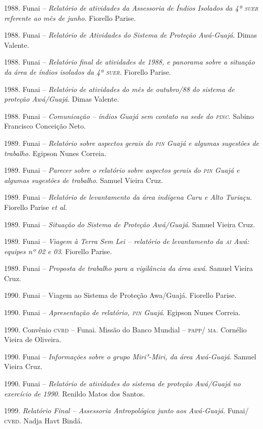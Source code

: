 \begin{bibliohedra}
1988. Funai -- \emph{Relatório de atividades da Assessoria de
Índios Isolados da 4ª \textsc{suer} referente ao mês de junho}. Fiorello Parise.

1988. Funai -- \emph{Relatório de Atividades do Sistema de
Proteção Awá-Guajá}. Dimas Valente.

1988. Funai -- \emph{Relatório final de atividades de 1988, e
panorama sobre a situação da área de índios isolados da 4ª \textsc{suer}}.
Fiorello Parise.

1988. Funai -- \emph{Relatório} \emph{de atividades do mês de
outubro/88 do sistema de proteção Awá/Guajá}. Dimas Valente.

1988. Funai -- \emph{Comunicação -- índios Guajá sem contato na
sede do \textsc{pinc}}. Sabino Francisco Conceição Neto.

1989. Funai -- \emph{Relatório sobre aspectos gerais do \textsc{pin}
Guajá e algumas sugestões de trabalho}. Egipson Nunes Correia.

1989. Funai -- \emph{Parecer sobre o relatório sobre aspectos
gerais do \textsc{pin} Guajá e algumas sugestões de trabalho}. Samuel Vieira
Cruz.

1989. Funai -- \emph{Relatório de levantamento da área indígena
Caru e Alto Turiaçu.} Fiorello Parise \emph{et al}.

1989. Funai -- \emph{Situação do Sistema de Proteção
Awá/Guajá}. Samuel Vieira Cruz.

1989. Funai -- \emph{Viagem à Terra Sem Lei -- relatório de
levantamento da \textsc{ai} Awá: equipes nº 02 e 03}. Fiorello Parise.

1989. Funai -- \emph{Proposta de trabalho para a vigilância da
área awá}. Samuel Vieira Cruz.

1990. Funai -- Viagem ao Sistema de Proteção Awa/Guajá.
Fiorello Parise.

1990. Funai -- \emph{Apresentação de relatório, \textsc{pin} Guajá}.
Egipson Nunes Correia.

1990. Convênio \textsc{cvrd} -- Funai. Missão do Banco Mundial -- \textsc{papp}/
\textsc{ma}. Cornélio Vieira de Oliveira.

1990. Funai -- \emph{Informações sobre o grupo Miri"-Miri, da
área Awá-Guajá}. Samuel Vieira Cruz.

1990. Funai -- \emph{Relatório de atividades do sistema de
proteção Awá/Guajá no exercício de 1990.} Renildo Matos dos Santos.

1999. \emph{Relatório Final -- Assessoria Antropológica junto aos
Awá-Guajá}. Funai/ \textsc{cvrd}. Nadja Havt Bindá.


\end{bibliohedra}
